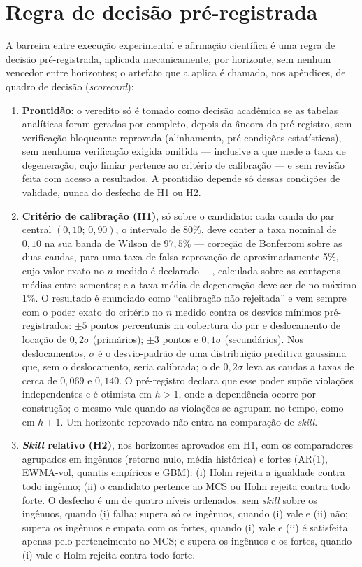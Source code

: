 \section{Regra de decisão pré-registrada} \label{sec:scorecard}
A barreira entre execução experimental e afirmação científica é uma regra de decisão pré-registrada, aplicada mecanicamente, por horizonte, sem nenhum vencedor entre horizontes; o artefato que a aplica é chamado, nos apêndices, de quadro de decisão (\textit{scorecard}):
\begin{enumerate}
    \item \textbf{Prontidão}: o veredito só é tomado como decisão acadêmica se as tabelas analíticas foram geradas por completo, depois da âncora do pré-registro, sem verificação bloqueante reprovada (alinhamento, pré-condições estatísticas), sem nenhuma verificação exigida omitida --- inclusive a que mede a taxa de degeneração, cujo limiar pertence ao critério de calibração --- e sem revisão feita com acesso a resultados. A prontidão depende só dessas condições de validade, nunca do desfecho de H1 ou H2.
    \item \textbf{Critério de calibração (H1)}, só sobre o candidato: cada cauda do par central \((0{,}10;\,0{,}90)\), o intervalo de 80\%, deve conter a taxa nominal de \(0{,}10\) na sua banda de Wilson de \(97{,}5\%\) --- correção de Bonferroni sobre as duas caudas, para uma taxa de falsa reprovação de aproximadamente 5\%, cujo valor exato no \(n\) medido é declarado ---, calculada sobre as contagens médias entre sementes; e a taxa média de degeneração deve ser de no máximo 1\%. O resultado é enunciado como ``calibração não rejeitada'' e vem sempre com o poder exato do critério no \(n\) medido contra os desvios mínimos pré-registrados: \(\pm 5\) pontos percentuais na cobertura do par e deslocamento de locação de \(0{,}2\sigma\) (primários); \(\pm 3\) pontos e \(0{,}1\sigma\) (secundários). Nos deslocamentos, \(\sigma\) é o desvio-padrão de uma distribuição preditiva gaussiana que, sem o deslocamento, seria calibrada; o de \(0{,}2\sigma\) leva as caudas a taxas de cerca de \(0{,}069\) e \(0{,}140\). O pré-registro declara que esse poder supõe violações independentes e é otimista em \(h > 1\), onde a dependência ocorre por construção; o mesmo vale quando as violações se agrupam no tempo, como em \(h+1\). Um horizonte reprovado não entra na comparação de \textit{skill}.
    \item \textbf{\textit{Skill} relativo (H2)}, nos horizontes aprovados em H1, com os comparadores agrupados em ingênuos (retorno nulo, média histórica) e fortes (AR(1), EWMA-vol, quantis empíricos e GBM): (i) Holm rejeita a igualdade contra todo ingênuo; (ii) o candidato pertence ao MCS ou Holm rejeita contra todo forte. O desfecho é um de quatro níveis ordenados: sem \textit{skill} sobre os ingênuos, quando (i) falha; supera só os ingênuos, quando (i) vale e (ii) não; supera os ingênuos e empata com os fortes, quando (i) vale e (ii) é satisfeita apenas pelo pertencimento ao MCS; e supera os ingênuos e os fortes, quando (i) vale e Holm rejeita contra todo forte.

\end{enumerate}
